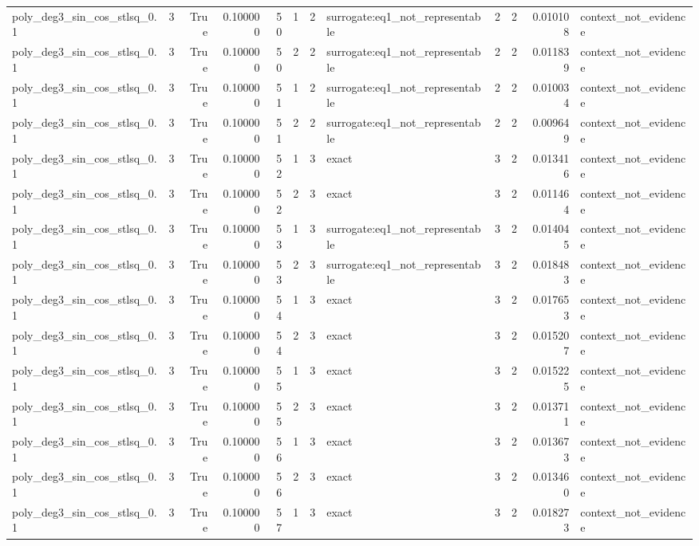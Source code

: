 \begin{tabular}{lrrrrrrlrrrl}
poly\_deg3\_sin\_cos\_stlsq\_0.1 & 3 & True & 0.100000 & 50 & 1 & 2 & surrogate:eq1\_not\_representable & 2 & 2 & 0.010108 & context\_not\_evidence \\
poly\_deg3\_sin\_cos\_stlsq\_0.1 & 3 & True & 0.100000 & 50 & 2 & 2 & surrogate:eq1\_not\_representable & 2 & 2 & 0.011839 & context\_not\_evidence \\
poly\_deg3\_sin\_cos\_stlsq\_0.1 & 3 & True & 0.100000 & 51 & 1 & 2 & surrogate:eq1\_not\_representable & 2 & 2 & 0.010034 & context\_not\_evidence \\
poly\_deg3\_sin\_cos\_stlsq\_0.1 & 3 & True & 0.100000 & 51 & 2 & 2 & surrogate:eq1\_not\_representable & 2 & 2 & 0.009649 & context\_not\_evidence \\
poly\_deg3\_sin\_cos\_stlsq\_0.1 & 3 & True & 0.100000 & 52 & 1 & 3 & exact & 3 & 2 & 0.013416 & context\_not\_evidence \\
poly\_deg3\_sin\_cos\_stlsq\_0.1 & 3 & True & 0.100000 & 52 & 2 & 3 & exact & 3 & 2 & 0.011464 & context\_not\_evidence \\
poly\_deg3\_sin\_cos\_stlsq\_0.1 & 3 & True & 0.100000 & 53 & 1 & 3 & surrogate:eq1\_not\_representable & 3 & 2 & 0.014045 & context\_not\_evidence \\
poly\_deg3\_sin\_cos\_stlsq\_0.1 & 3 & True & 0.100000 & 53 & 2 & 3 & surrogate:eq1\_not\_representable & 3 & 2 & 0.018483 & context\_not\_evidence \\
poly\_deg3\_sin\_cos\_stlsq\_0.1 & 3 & True & 0.100000 & 54 & 1 & 3 & exact & 3 & 2 & 0.017653 & context\_not\_evidence \\
poly\_deg3\_sin\_cos\_stlsq\_0.1 & 3 & True & 0.100000 & 54 & 2 & 3 & exact & 3 & 2 & 0.015207 & context\_not\_evidence \\
poly\_deg3\_sin\_cos\_stlsq\_0.1 & 3 & True & 0.100000 & 55 & 1 & 3 & exact & 3 & 2 & 0.015225 & context\_not\_evidence \\
poly\_deg3\_sin\_cos\_stlsq\_0.1 & 3 & True & 0.100000 & 55 & 2 & 3 & exact & 3 & 2 & 0.013711 & context\_not\_evidence \\
poly\_deg3\_sin\_cos\_stlsq\_0.1 & 3 & True & 0.100000 & 56 & 1 & 3 & exact & 3 & 2 & 0.013673 & context\_not\_evidence \\
poly\_deg3\_sin\_cos\_stlsq\_0.1 & 3 & True & 0.100000 & 56 & 2 & 3 & exact & 3 & 2 & 0.013460 & context\_not\_evidence \\
poly\_deg3\_sin\_cos\_stlsq\_0.1 & 3 & True & 0.100000 & 57 & 1 & 3 & exact & 3 & 2 & 0.018273 & context\_not\_evidence \\

\end{tabular}
